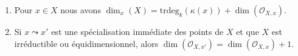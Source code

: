 \begin{lemma}
\begin{enumerate}
\begin{enumerate}
\item toute chaîne maximale de spécialisations non triviales $x =
x_0 \leadsto x_1 \leadsto \ldots \leadsto x_n = x'$ a une
longueur $n = \text{trdeg}_k(\kappa(x)) - \text{trdeg}_k(\kappa(x'))$.
\end{enumerate}
\item
\label{item-dimension-formula}
Pour $x \in X$ nous avons
$\dim_x(X) =
\text{trdeg}_k(\kappa(x)) + \dim(\mathcal{O}_{X, x})$. \item
\label{item-immediate-specialization-local-ring}
Si $x \leadsto x'$ est une spécialisation immédiate des
points de $X$ et que $X$ est irréductible ou équidimensionnel,
alors $\dim(\mathcal{O}_{X, x'}) = \dim(\mathcal{O}_{X, x}) + 1$.
\end{enumerate}
\end{lemma}

